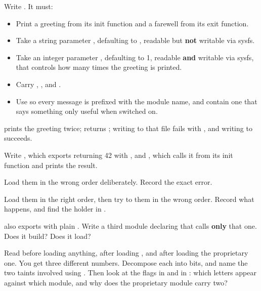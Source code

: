 Write . It must:
\begin{itemize}
  \item Print a greeting from its init function and a farewell from its exit function.
  \item Take a string parameter , defaulting to , readable but \textbf{not}
    writable via sysfs.
  \item Take an integer parameter , defaulting to 1, readable \textbf{and} writable via
    sysfs, that controls how many times the greeting is printed.
  \item Carry , ,  and
    .
  \item Use  so every message is prefixed with the module name, and contain one
     that says something only useful when switched on.
\end{itemize}

\checkyourself {} prints the greeting twice;  returns ; writing to that file fails with
, and writing to  succeeds.

\label{c4:ex:7}

Write , which exports  returning 42 with
, and , which calls it from its init function and prints the
result.

 Load them in the wrong order deliberately. Record the exact error.

 Load them in the right order, then try to  them in the wrong order. Record
what happens, and find the holder in .

  also exports  with plain .
Write a third module declaring  that calls \textbf{only} that
one. Does it build? Does it load?

 Read  before loading anything, after loading
, and after loading the proprietary one. You get three different numbers. Decompose
each into bits, and name the two taints involved using . Then look at
the flags in  and in : which letters appear
against which module, and why does the proprietary module carry two?

